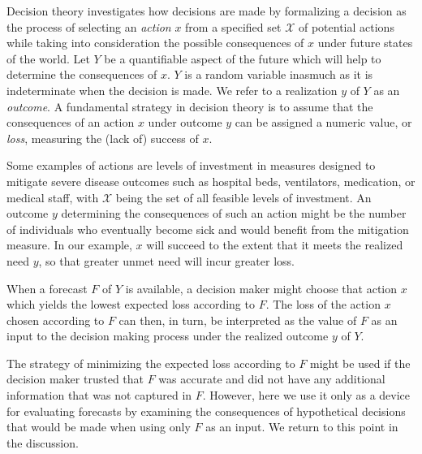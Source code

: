 \documentclass{article}
\begin{document}
Decision theory investigates how decisions are made by formalizing a decision as the process of selecting an
\emph{action} $x$ from a specified set $\mathcal{X}$ of potential actions while taking into consideration the possible
consequences of $x$ under future states of the world. Let $Y$ be a quantifiable aspect of the future which will help to
determine the consequences of $x$. $Y$ is a random variable inasmuch as it is indeterminate when the decision is made.
We refer to a realization $y$ of $Y$ as an \emph{outcome}. A fundamental strategy in decision theory is to assume that
the consequences of an action $x$ under outcome $y$ can be assigned a numeric value, or \emph{loss}, measuring the (lack
of) success of $x$.

Some examples of actions are levels of investment in measures designed to mitigate severe disease outcomes such as
hospital beds, ventilators, medication, or medical staff, with $\mathcal{X}$ being the set of all feasible levels of
investment. An outcome $y$ determining the consequences of such an action might be the number of individuals who
eventually become sick and would benefit from the mitigation measure. In our example, $x$ will succeed to the extent
that it meets the realized need $y$, so that greater unmet need will incur greater loss.

When a forecast $F$ of $Y$ is available, a decision maker might choose that action $x$ which yields the lowest expected
loss according to $F$. The loss of the action $x$ chosen according to $F$ can then, in turn, be interpreted as the value
of $F$ as an input to the decision making process under the realized outcome $y$ of $Y$.

The strategy of minimizing the expected loss according to $F$ might be used if the decision maker trusted that $F$ was
accurate and did not have any additional information that was not captured in $F$. However, here we use it only as a
device for evaluating forecasts by examining the consequences of hypothetical decisions that would be made when using
only $F$ as an input. We return to this point in the discussion.
\end{document}
